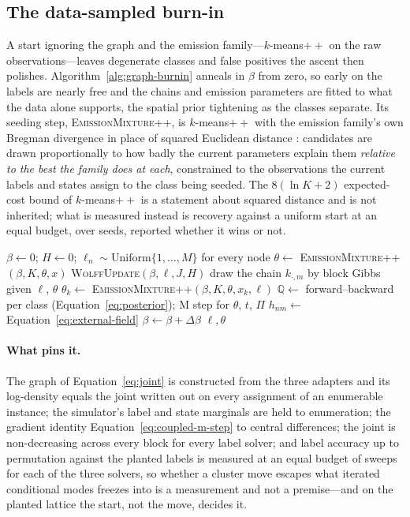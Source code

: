 \documentclass[11pt,a4paper]{article}
\begin{document}
\subsection{The data-sampled burn-in}
A start ignoring the graph and the emission family---$k$-means$++$ on the raw
observations---leaves degenerate classes and false positives the ascent then
polishes. Algorithm~\ref{alg:graph-burnin} anneals in $\beta$ from zero, so
early on the labels are nearly free and the chains and emission parameters are
fitted to what the data alone supports, the spatial prior tightening as the
classes separate. Its seeding step,
\textsc{EmissionMixture++}, is $k$-means$++$ with the emission family's own
Bregman divergence in place of squared Euclidean distance
\citep{arthur2007,banerjee2005}: candidates are drawn proportionally to how
badly the current parameters explain them \emph{relative to the best the
family does at each}, constrained to the observations the current labels and
states assign to the class being seeded. The $8(\ln K + 2)$
expected-cost bound of $k$-means$++$ is a statement about squared distance and
is not inherited; what is measured instead is recovery against a uniform start
at an equal budget, over seeds, reported whether it wins or not.

\begin{algorithm}[htbp]
\caption{Data-sampled burn-in on the coupled graph}
\label{alg:graph-burnin}
\begin{algorithmic}[1]
\State $\beta \gets 0$; $H \gets 0$; $\ell_n \sim \mathrm{Uniform}\{1, \dots, M\}$ for every node
\State $\theta \gets$ \textsc{EmissionMixture++}$(\beta, K, \theta, x)$
  \State \textsc{WolffUpdate}$(\beta, \ell, J, H)$ 
   draw the chain $k_{\cdot, m}$ by block Gibbs given $\ell$, $\theta$ \EndFor
   $\theta_k \gets$ \textsc{EmissionMixture++}$(\beta, K, \theta, x_k, \ell)$ 
  \EndFor
  \State $\mathbb{Q} \gets$ forward--backward per class (Equation~\ref{eq:posterior}); M step for $\theta$, $t$, $\Pi$
  \State $h_{nm} \gets$ Equation~\ref{eq:external-field}
  \State $\beta \gets \beta + \Delta\beta$
\EndWhile
\State \Return $\ell, \theta$
\end{algorithmic}
\end{algorithm}

\paragraph{What pins it.}
The graph of Equation~\ref{eq:joint} is constructed from the three adapters
and its log-density equals the joint written out on every assignment of an
enumerable instance; the simulator's label and state marginals are held to
enumeration; the gradient identity Equation~\ref{eq:coupled-m-step} to
central differences; the joint is non-decreasing across every block for every
label solver; and label accuracy up to permutation against the planted labels
is measured at an equal budget of sweeps for each of the three solvers, so
whether a cluster move escapes what iterated conditional modes freezes into is
a measurement and not a premise---and on the planted lattice the start, not the
move, decides it.
\end{document}
